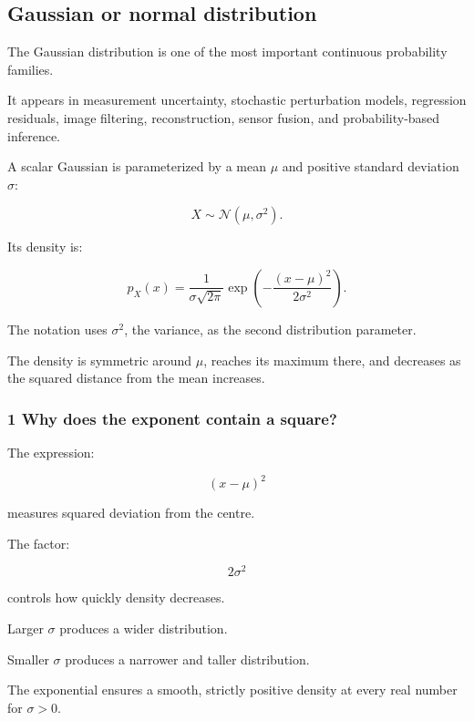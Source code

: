 \subsection{Gaussian or normal distribution}\label{02-foundations-ii-ch023-gaussian-or-normal-distribution}

\hypertarget{02-foundations-ii-ch023-gaussian-or-normal-distribution}{}

The Gaussian distribution is one of the most important continuous probability families.

It appears in measurement uncertainty, stochastic perturbation models, regression residuals, image filtering, reconstruction, sensor fusion, and probability-based inference.

A scalar Gaussian is parameterized by a mean \(\mu\) and positive standard deviation \(\sigma\):

\[
 \boxed{ X\sim\mathcal N(\mu,\sigma^2) }.
\]

Its density is:

\[
 \boxed{ p_X(x)= \frac1{\sigma\sqrt{2\pi}} \exp\left( -\frac{(x-\mu)^2}{2\sigma^2} \right) }.
\]

The notation uses \(\sigma^2\), the variance, as the second distribution parameter.

The density is symmetric around \(\mu\), reaches its maximum there, and decreases as the squared distance from the mean increases.

\subsubsection{1 Why does the exponent contain a square?}\label{02-foundations-ii-ch023-why-does-the-exponent-contain-a-square}

\hypertarget{02-foundations-ii-ch023-why-does-the-exponent-contain-a-square}{}

The expression:

\[
 (x-\mu)^2
\]

measures squared deviation from the centre.

The factor:

\[
 2\sigma^2
\]

controls how quickly density decreases.

Larger \(\sigma\) produces a wider distribution.

Smaller \(\sigma\) produces a narrower and taller distribution.

The exponential ensures a smooth, strictly positive density at every real number for \(\sigma>0\).

